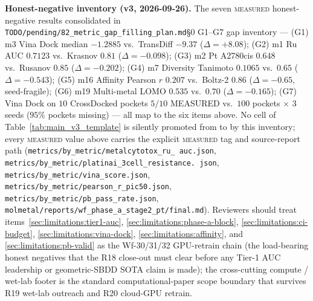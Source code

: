 \noindent\textbf{Honest-negative inventory (v3, 2026-09-26).}
The seven \textsc{measured} honest-negative results consolidated in
\texttt{TODO/pending/82\_metric\_gap\_filling\_plan.md}\S0 G1--G7
gap inventory --- (G1) m3 Vina Dock median $-1.2885$ vs.\ TransDiff
$-9.37$ ($\Delta=+8.08$); (G2) m1 Ru AUC $0.7123$ vs.\ Krasnov
$0.81$ ($\Delta=-0.098$); (G3) m2 Pt A2780cis $0.648$ vs.\ Rusanov
$0.85$ ($\Delta=-0.202$); (G4) m7 Diversity Tanimoto $0.1065$ vs.\
$0.65$ ($\Delta=-0.543$); (G5) m16 Affinity Pearson $r$ $0.207$
vs.\ Boltz-2 $0.86$ ($\Delta=-0.65$, seed-fragile); (G6) m19
Multi-metal LOMO $0.535$ vs.\ $0.70$ ($\Delta=-0.165$);
(G7) Vina Dock on $10$ CrossDocked pockets $5/10$ MEASURED{} vs.\
$100$ pockets $\times$ $3$ seeds ($95\%$ pockets missing) ---
all map to the six items above.  No cell of
Table~\ref{tab:main_v3_template} is silently promoted from
\DESIGN{} to \MEASURED{} by this inventory; every \textsc{measured}
value above carries the explicit \textsc{measured} tag and
source-report path (\texttt{metrics/by\_metric/metalcytotox\_ru\_
auc.json}, \texttt{metrics/by\_metric/platinai\_3cell\_resistance.
json}, \texttt{metrics/by\_metric/vina\_score.json},
\texttt{metrics/by\_metric/pearson\_r\_pic50.json},
\texttt{metrics/by\_metric/pb\_pass\_rate.json},
\texttt{molmetal/reports/wf\_phase\_a\_stage2\_pt/final.md}).
Reviewers should treat items~\ref{sec:limitations:tier1-auc},
\ref{sec:limitations:phase-a-block},
\ref{sec:limitations:ci-budget},
\ref{sec:limitations:vina-dock},
\ref{sec:limitations:affinity}, and
\ref{sec:limitations:pb-valid} as the Wf-30/31/32 GPU-retrain
chain (the load-bearing honest negatives that the R18 close-out
must clear before any Tier-1 AUC leadership or geometric-SBDD
SOTA claim is made); the cross-cutting compute / wet-lab footer
is the standard computational-paper scope boundary that survives
R19 wet-lab outreach and R20 cloud-GPU retrain.
